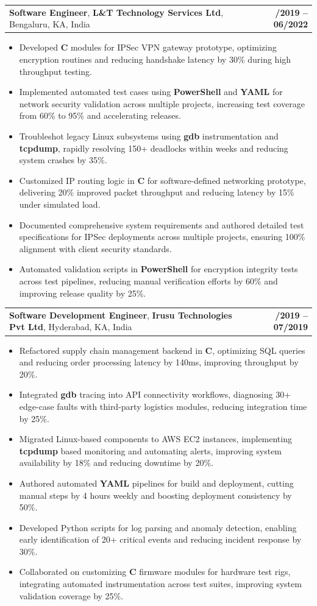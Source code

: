 \documentclass[letterpaper,11pt]{article}
\makeatletter
\newcommand{\resumeItem}[1]{
  \item\footnotesize{
    {#1 \vspace{-2pt}}
  }
}
\newcommand{\resumeSubheading}[4]{
  \vspace{-2pt}\item
    \begin{tabular*}{1.0\textwidth}[t]{l@{\extracolsep{\fill}}r}
      \textbf{\fontsize{10pt}{14pt}\selectfont #3}, \textbf{\fontsize{10pt}{14pt}\selectfont #1}, \fontsize{10pt}{14pt}\selectfont #4 & \textbf{\fontsize{10pt}{14pt}\selectfont #2} \\
    \end{tabular*}\vspace{-7pt}
}
\newcommand{\resumeItemListStart}{\begin{itemize}[leftmargin=*]}
\newcommand{\resumeItemListEnd}{\end{itemize}\vspace{-5pt}}
\makeatother
\begin{document}
    \resumeSubheading
        {L\&T Technology Services Ltd}{08/2019 -- 06/2022}
        {Software Engineer}{Bengaluru, KA, India}
      \resumeItemListStart
        \resumeItem{Developed \textbf{C\+\+} modules for IPSec VPN gateway prototype, optimizing encryption routines and reducing handshake latency by 30\% during high throughput testing.}
        \resumeItem{Implemented automated test cases using \textbf{PowerShell} and \textbf{YAML} for network security validation across multiple projects, increasing test coverage from 60\% to 95\% and accelerating releases.}
        \resumeItem{Troubleshot legacy Linux subsystems using \textbf{gdb} instrumentation and \textbf{tcpdump}, rapidly resolving 150+ deadlocks within weeks and reducing system crashes by 35\%.}
        \resumeItem{Customized IP routing logic in \textbf{C} for software-defined networking prototype, delivering 20\% improved packet throughput and reducing latency by 15\% under simulated load.}
        \resumeItem{Documented comprehensive system requirements and authored detailed test specifications for IPSec deployments across multiple projects, ensuring 100\% alignment with client security standards.}
        \resumeItem{Automated validation scripts in \textbf{PowerShell} for encryption integrity tests across test pipelines, reducing manual verification efforts by 60\% and improving release quality by 25\%.}
      \resumeItemListEnd

    \resumeSubheading
        {Irusu Technologies Pvt Ltd}{01/2019 -- 07/2019}
        {Software Development Engineer}{Hyderabad, KA, India}
      \resumeItemListStart
        \resumeItem{Refactored supply chain management backend in \textbf{C\+\+}, optimizing SQL queries and reducing order processing latency by 140ms, improving throughput by 20\%.}
        \resumeItem{Integrated \textbf{gdb} tracing into API connectivity workflows, diagnosing 30+ edge-case faults with third-party logistics modules, reducing integration time by 25\%.}
        \resumeItem{Migrated Linux-based components to AWS EC2 instances, implementing \textbf{tcpdump} based monitoring and automating alerts, improving system availability by 18\% and reducing downtime by 20\%.}
        \resumeItem{Authored automated \textbf{YAML} pipelines for build and deployment, cutting manual steps by 4 hours weekly and boosting deployment consistency by 50\%.}
        \resumeItem{Developed Python scripts for log parsing and anomaly detection, enabling early identification of 20+ critical events and reducing incident response by 30\%.}
        \resumeItem{Collaborated on customizing \textbf{C} firmware modules for hardware test rigs, integrating automated instrumentation across test suites, improving system validation coverage by 25\%.}
      \resumeItemListEnd
\end{document}
